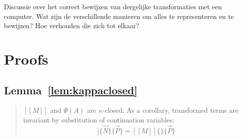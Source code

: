 \documentclass[a4paper,11pt,draft]{article}
\begin{document}
Discussie over het correct bewijzen van dergelijke transformaties met een
computer. Wat zijn de verschillende manieren om alles te representeren en te
bewijzen? Hoe verhouden die zich tot elkaar?


\appendix


\section{Proofs}\label{sec:proofs}


\subsection{Lemma~\ref{lem:kappaclosed}}

\begin{quote}
  $[\![M]\!]$ and $\Psi(A)$ are $\kappa$-closed. As a corollary, transformed
  terms are invariant by substitution of continuation variables:
  \begin{equation*}
    [\![M]\!]\{\vec{N}\}\{\vec{P}\} = [\![M]\!]\{\}\{\vec{P}\}
  \end{equation*}
\end{quote}
\end{document}
